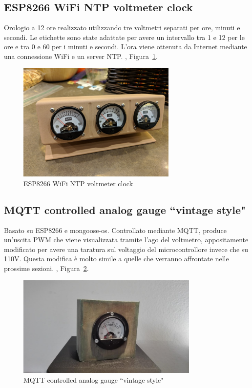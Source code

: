 \documentclass[12pt,a4paper]{report}
\begin{document}
\subsection{ESP8266 WiFi NTP voltmeter clock}
Orologio a 12 ore realizzato utilizzando tre voltmetri separati per ore, minuti e secondi. Le etichette sono state adattate per avere un intervallo
tra 1 e 12 per le ore e tra 0 e 60 per i minuti e secondi. L'ora viene ottenuta da Internet mediante una connessione WiFi e un server NTP.
\cite{voltclock}, Figura~\ref{fig:voltclock}.

\begin{figure}[h]
  \centering
  \includegraphics[width=0.7\textwidth]{voltclock}
  \caption{ESP8266 WiFi NTP voltmeter clock  \cite{voltclock}}
  \label{fig:voltclock}
\end{figure}


\subsection{MQTT controlled analog gauge ``vintage style"}
Basato su ESP8266 e mongoose-os. Controllato mediante MQTT, produce un'uscita PWM che viene visualizzata tramite l'ago del voltmetro,
appositamente modificato per avere una taratura sul voltaggio del microcontrollore invece che su 110V.
Questa modifica è molto simile a quelle che verranno affrontate nelle prossime sezioni.
\cite{gaugevintagestyle}, Figura~\ref{fig:gaugevintagestyle}.

\begin{figure}[h]
  \centering
  \includegraphics[width=0.8\textwidth]{gaugevintagestyle}
  \caption{MQTT controlled analog gauge ``vintage style" \cite{gaugevintagestyle}}
  \label{fig:gaugevintagestyle}
\end{figure}
\end{document}
